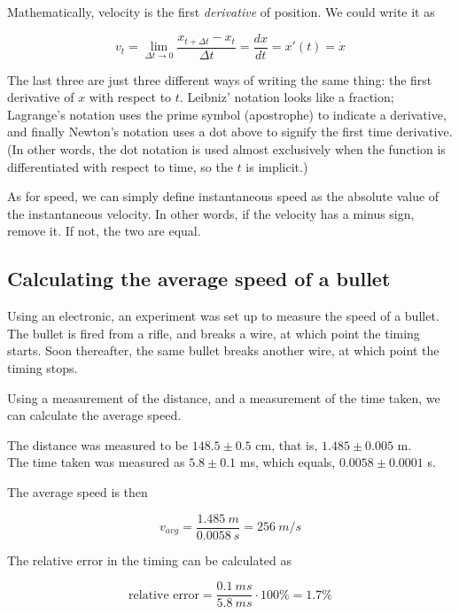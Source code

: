 Mathematically, velocity is the first \emph{derivative} of position.
We could write it as

\begingroup
\large
\begin{equation}
 v_t = \lim_{\Delta t \to 0} \frac{x_{t + \Delta t} - x_t}{\Delta t} = \frac{dx}{dt} = x'(t) = \dot{x}
\end{equation}
\endgroup

The last three are just three different ways of writing the same thing: the first derivative of $x$ with respect to $t$. Leibniz' notation looks like a fraction; Lagrange's notation uses the prime symbol (apostrophe) to indicate a derivative, and finally Newton's notation uses a dot above to signify the first time derivative. (In other words, the dot notation is used almost exclusively when the function is differentiated with respect to time, so the $t$ is implicit.)

As for speed, we can simply define instantaneous speed as the absolute value of the instantaneous velocity. In other words, if the velocity has a minus sign, remove it. If not, the two are equal.

\subsection{Calculating the average speed of a bullet}

Using an electronic, an experiment was set up to measure the speed of a bullet. The bullet is fired from a rifle, and breaks a wire, at which point the timing starts. Soon thereafter, the same bullet breaks another wire, at which point the timing stops.

Using a measurement of the distance, and a measurement of the time taken, we can calculate the average speed.

The distance was measured to be $148.5 \pm 0.5$ cm, that is, $1.485 \pm 0.005$ m.\\
The time taken was measured as $5.8 \pm 0.1$ ms, which equals, $0.0058 \pm 0.0001$ s.

The average speed is then

\begin{equation}
v_{avg} = \frac{\SI{1.485}{m}}{\SI{0.0058}{s}} = \SI{256}{m/s}
\end{equation}

The relative error in the timing can be calculated as 

\begin{equation}
\text{relative error} = \frac{\SI{0.1}{ms}}{\SI{5.8}{ms}} \cdot 100\% = 1.7\% 
\end{equation}

